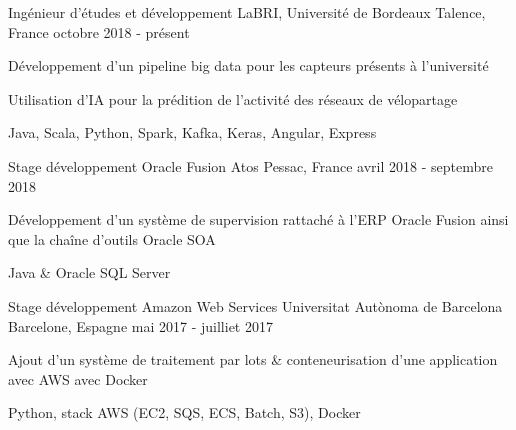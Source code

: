 
\begin{cventries}
	\cventry
	{Ingénieur d'études et développement}
	{LaBRI, Université de Bordeaux}
	{Talence, France}
	{octobre 2018 - présent}
	{
		\begin{cvitems}
			\item {Développement d'un pipeline big data pour les capteurs présents à l'université}
			\item {Utilisation d'IA pour la prédition de l'activité des réseaux de vélopartage}
			\item {Java, Scala, Python, Spark, Kafka, Keras, Angular, Express}
		\end{cvitems}
	}
	\cventry
	{Stage développement Oracle Fusion}
	{Atos}
	{Pessac, France}
	{avril 2018 - septembre 2018}
	{
		\begin{cvitems}
			\item {Développement d'un système de supervision rattaché à l'ERP Oracle Fusion ainsi que la chaîne d'outils Oracle SOA}
			\item {Java \& Oracle SQL Server}
		\end{cvitems}
	}
	\cventry
	{Stage développement Amazon Web Services}
	{Universitat Autònoma de Barcelona}
	{Barcelone, Espagne}
	{mai 2017 - juilliet 2017}
	{
		\begin{cvitems}
			\item {Ajout d’un système de traitement par lots \& conteneurisation d'une application avec AWS avec Docker}
			\item {Python, stack AWS (EC2, SQS, ECS, Batch, S3), Docker}
		\end{cvitems}
	}
\end{cventries}